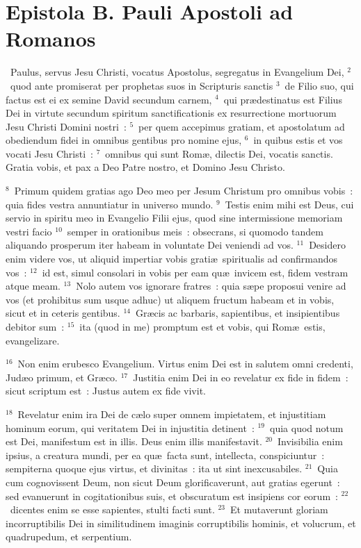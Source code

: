 \clearpage
{\centering \section*{Epistola B. Pauli Apostoli ad Romanos}}\thispagestyle{empty}

~Paulus, servus Jesu Christi, vocatus Apostolus, segregatus in Evangelium Dei,
${}^{2}$~quod ante promiserat per prophetas suos in Scripturis sanctis
${}^{3}$~de Filio suo, qui factus est ei ex semine David secundum carnem,
${}^{4}$~qui pr\ae destinatus est Filius Dei in virtute secundum spiritum sanctificationis ex resurrectione mortuorum Jesu Christi Domini nostri~:
${}^{5}$~per quem accepimus gratiam, et apostolatum ad obediendum fidei in omnibus gentibus pro nomine ejus,
${}^{6}$~in quibus estis et vos vocati Jesu Christi~:
${}^{7}$~omnibus qui sunt Rom\ae , dilectis Dei, vocatis sanctis. Gratia vobis, et pax a Deo Patre nostro, et Domino Jesu Christo.


${}^{8}$~Primum quidem gratias ago Deo meo per Jesum Christum pro omnibus vobis~: quia fides vestra annuntiatur in universo mundo.
${}^{9}$~Testis enim mihi est Deus, cui servio in spiritu meo in Evangelio Filii ejus, quod sine intermissione memoriam vestri facio
${}^{10}$~semper in orationibus meis~: obsecrans, si quomodo tandem aliquando prosperum iter habeam in voluntate Dei veniendi ad vos.
${}^{11}$~Desidero enim videre vos, ut aliquid impertiar vobis grati\ae\ spiritualis ad confirmandos vos~:
${}^{12}$~id est, simul consolari in vobis per eam qu\ae\ invicem est, fidem vestram atque meam.
${}^{13}$~Nolo autem vos ignorare fratres~: quia s\ae pe proposui venire ad vos (et prohibitus sum usque adhuc) ut aliquem fructum habeam et in vobis, sicut et in ceteris gentibus.
${}^{14}$~Gr\ae cis ac barbaris, sapientibus, et insipientibus debitor sum~:
${}^{15}$~ita (quod in me) promptum est et vobis, qui Rom\ae\ estis, evangelizare.


${}^{16}$~Non enim erubesco Evangelium. Virtus enim Dei est in salutem omni credenti, Jud\ae o primum, et Gr\ae co.
${}^{17}$~Justitia enim Dei in eo revelatur ex fide in fidem~: sicut scriptum est~: Justus autem ex fide vivit.


${}^{18}$~Revelatur enim ira Dei de c\ae lo super omnem impietatem, et injustitiam hominum eorum, qui veritatem Dei in injustitia detinent~:
${}^{19}$~quia quod notum est Dei, manifestum est in illis. Deus enim illis manifestavit.
${}^{20}$~Invisibilia enim ipsius, a creatura mundi, per ea qu\ae\ facta sunt, intellecta, conspiciuntur~: sempiterna quoque ejus virtus, et divinitas~: ita ut sint inexcusabiles.
${}^{21}$~Quia cum cognovissent Deum, non sicut Deum glorificaverunt, aut gratias egerunt~: sed evanuerunt in cogitationibus suis, et obscuratum est insipiens cor eorum~:
${}^{22}$~dicentes enim se esse sapientes, stulti facti sunt.
${}^{23}$~Et mutaverunt gloriam incorruptibilis Dei in similitudinem imaginis corruptibilis hominis, et volucrum, et quadrupedum, et serpentium.


